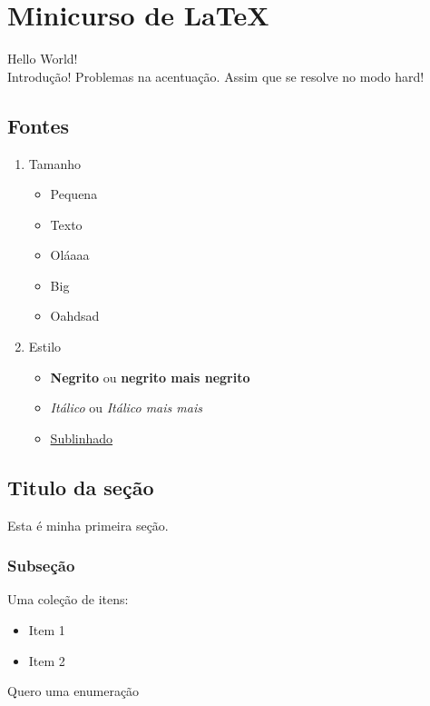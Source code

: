 \documentclass[10pt,a4paper,twocolumn]{book}
\begin{document}
 
	
	\tableofcontents
	
	\chapter{Minicurso de \LaTeX}
	
	Hello World! \\ 
	Introdução!
	Problemas na acentua\c{c}\~ao. Assim que se resolve no modo hard!
	
	\section{Fontes}
		\begin{enumerate}
			\item Tamanho
				\begin{itemize}
					\item {\tiny Pequena} 
					\item {\small Texto } 
					\item {\Large Oláaaa}  
					\item {\LARGE Big }
					\item {\Huge Oahdsad}
				\end{itemize}
			\item Estilo
				\begin{itemize}
					\item \textbf{Negrito} ou {\bf negrito mais negrito}
					\item \textit{Itálico} ou {\it Itálico mais mais}
					\item \underline{Sublinhado}
				\end{itemize}
			
		\end{enumerate}
	
	
	
	\section{Titulo da seção}
		Esta é minha primeira seção.
		\subsection{Subseção}
			Uma coleção de itens:
			\begin{itemize}
				\item Item 1
				\item Item 2
			\end{itemize}
			Quero uma enumeração
		
\end{document}
